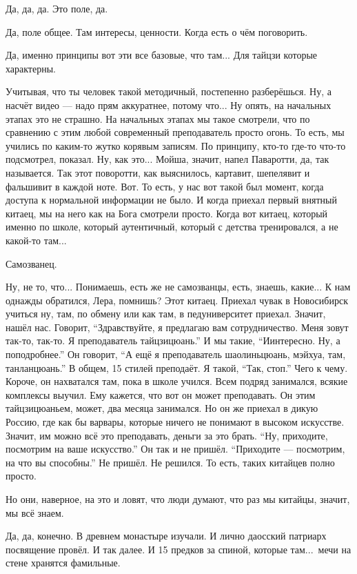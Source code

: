 \I
Да, да, да. Это поле, да.

\A
Да, поле общее. Там интересы,
ценности. Когда есть
о чём поговорить.

\I
Да, именно принципы вот эти все
базовые, что там...
Для тайцзи которые характерны.

\A
Учитывая, что ты человек
такой методичный,
постепенно разберёшься.
Ну, а насчёт видео --- надо
прям аккуратнее, потому что...
Ну
опять, на начальных этапах это не страшно.
На начальных этапах
мы такое смотрели, что
по сравнению с этим любой
современный преподаватель
просто огонь.
То есть, мы учились по каким-то жутко корявым
записям.
По принципу, кто-то где-то что-то
подсмотрел, показал.
Ну, как это...
Мойша,
значит, напел
Паваротти, да, так называется.
Так этот поворотти, как выяснилось,
картавит, шепелявит
и фальшивит в каждой ноте.
Вот. То есть, у нас вот такой
был момент, когда доступа
к нормальной информации не было.
И когда приехал первый внятный
китаец, мы на него как на Бога смотрели
просто. Когда вот китаец,
который именно по школе,
который аутентичный, который
с детства тренировался, а не какой-то там...

\I
Самозванец.

\A
Ну, не то, что... Понимаешь, есть же не самозванцы,
есть, знаешь, какие...
К нам однажды обратился, Лера, помнишь?
Этот китаец. Приехал
чувак в Новосибирск
учиться
ну, там, по обмену
или как там, в
педуниверситет приехал.
Значит, нашёл нас.
Говорит, ``Здравствуйте, я
предлагаю вам сотрудничество.
Меня зовут так-то, так-то.
Я преподаватель тайцзицюань.''
И мы такие, ``Иинтересно.
Ну, а поподробнее.''
Он говорит, ``А ещё я преподаватель шаолиньцюань, мэйхуа, там,
танланцюань.'' В общем, 15
стилей преподаёт.
Я такой, ``Так, стоп.''
Чего к чему. Короче,
он нахватался там, пока
в школе учился.
Всем подряд занимался, всякие
комплексы выучил.
Ему кажется, что вот он
может преподавать.
Он этим тайцзицюаньем, может, два месяца
занимался. Но он же приехал в
дикую Россию, где
как бы варвары, которые
ничего не понимают в высоком искусстве.
Значит, им можно
всё это преподавать, деньги
за это брать. ``Ну, приходите, посмотрим
на ваше искусство.'' Он так и не
пришёл. ``Приходите ---
посмотрим, на что вы способны.''
Не пришёл. Не решился.
То есть, таких китайцев
полно просто.

\I
Но они, наверное, на это и
ловят, что люди думают,
что раз мы китайцы, значит, мы всё знаем.

\A
Да, да, конечно.
В древнем монастыре изучали.
И лично даосский
патриарх посвящение
провёл.
И так далее. И 15 предков
за спиной, которые там...\ мечи
на стене хранятся фамильные.

